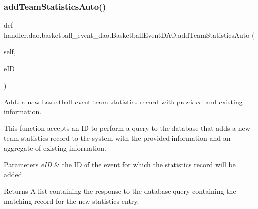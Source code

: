 \subsubsection{\texorpdfstring{add\+Team\+Statistics\+Auto()}{addTeamStatisticsAuto()}}
{\footnotesize\ttfamily def handler.\+dao.\+basketball\+\_\+event\+\_\+dao.\+Basketball\+Event\+D\+A\+O.\+add\+Team\+Statistics\+Auto (\begin{DoxyParamCaption}\item[{}]{self,  }\item[{}]{e\+ID }\end{DoxyParamCaption})}



Adds a new basketball event team statistics record with provided and existing information. 

This function accepts an ID to perform a query to the database that adds a new team statistics record to the system with the provided information and an aggregate of existing information.


\begin{DoxyParams}{Parameters}
{\em e\+ID} & the ID of the event for which the statistics record will be added\\
\hline
\end{DoxyParams}
\begin{DoxyReturn}{Returns}
A list containing the response to the database query containing the matching record for the new statistics entry. 
\end{DoxyReturn}
\mbox{\label{classhandler_1_1dao_1_1basketball__event__dao_1_1_basketball_event_d_a_o_a4d91c158960117f5f6c089f4674272cd}} 
